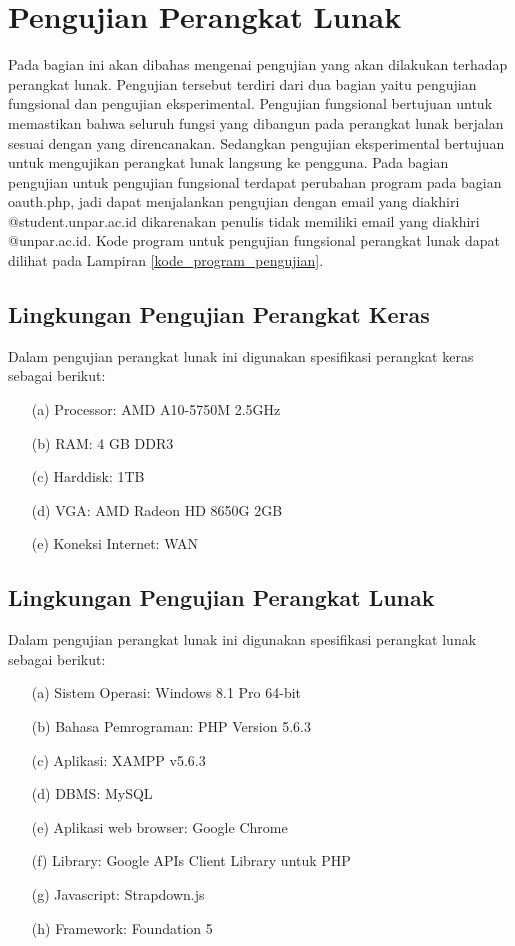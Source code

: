 \section{Pengujian Perangkat Lunak}
\label{sec:pengujianperangkatlunak}

Pada bagian ini akan dibahas mengenai pengujian yang akan dilakukan terhadap perangkat lunak. Pengujian tersebut terdiri dari dua bagian yaitu pengujian fungsional dan pengujian eksperimental. Pengujian fungsional bertujuan untuk memastikan bahwa seluruh fungsi yang dibangun pada perangkat lunak berjalan sesuai dengan yang direncanakan. Sedangkan pengujian eksperimental bertujuan untuk mengujikan perangkat lunak langsung ke pengguna. Pada bagian pengujian untuk pengujian fungsional terdapat perubahan program pada bagian oauth.php, jadi dapat menjalankan pengujian dengan email yang diakhiri @student.unpar.ac.id dikarenakan penulis tidak memiliki email yang diakhiri @unpar.ac.id. Kode program untuk pengujian fungsional perangkat lunak dapat dilihat pada Lampiran \ref{kode_program_pengujian}.

\subsection{Lingkungan Pengujian Perangkat Keras}
\label{sec:lingkunganpengujianperangkatkeras}

Dalam pengujian perangkat lunak ini digunakan spesifikasi perangkat keras sebagai berikut:

\begin{enumerate}
\item[(a)] Processor: AMD A10-5750M 2.5GHz
\item[(b)] RAM: 4 GB DDR3
\item[(c)] Harddisk: 1TB
\item[(d)] VGA: AMD Radeon HD 8650G 2GB
\item[(e)] Koneksi Internet: WAN
\end{enumerate}

\subsection{Lingkungan Pengujian Perangkat Lunak}
\label{sec:lingkunganpengujianperangkatlunak}

Dalam pengujian perangkat lunak ini digunakan spesifikasi perangkat lunak sebagai berikut:

\begin{enumerate}
\item[(a)] Sistem Operasi: Windows 8.1 Pro 64-bit
\item[(b)] Bahasa Pemrograman: PHP Version 5.6.3
\item[(c)] Aplikasi: XAMPP v5.6.3
\item[(d)] DBMS: MySQL
\item[(e)] Aplikasi web browser: Google Chrome
\item[(f)] Library: Google APIs Client Library untuk PHP
\item[(g)] Javascript: Strapdown.js
\item[(h)] Framework: Foundation 5
\end{enumerate}

